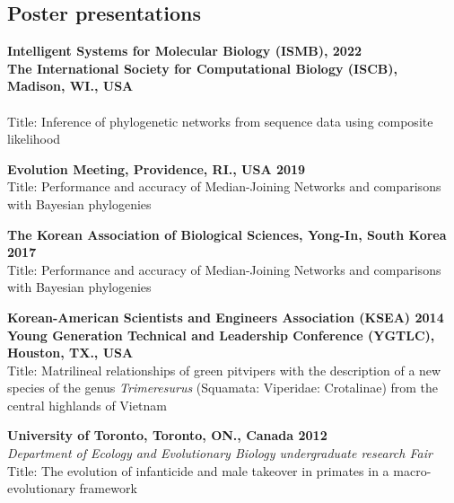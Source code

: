 \documentclass[11pt,letterpaper,sans]{moderncv} %
\begin{document}
\subsection{Poster presentations}
\begin{etaremune}
	\item \textbf{Intelligent Systems for Molecular Biology (ISMB), \hfill 2022}\\ \textbf{The International Society for Computational Biology (ISCB), Madison, WI., USA}\\
		{\small{}\\
		Title: Inference of phylogenetic networks from sequence data using composite likelihood}

	\item \textbf{Evolution Meeting, Providence, RI., USA \hfill 2019}\\
		{\small Title: Performance and accuracy of Median-Joining Networks and comparisons with Bayesian phylogenies}

	\item \textbf{The Korean Association of Biological Sciences, Yong-In, South Korea \hfill 2017}\\
		{\small Title: Performance and accuracy of Median-Joining Networks and comparisons with Bayesian phylogenies}
		  		  
	\item \textbf{Korean-American Scientists and Engineers Association (KSEA) \hfill{2014}\\
	Young Generation Technical and Leadership Conference (YGTLC), Houston, TX., USA}\\
		{\small Title: Matrilineal relationships of green pitvipers with the description of a new species of the genus \textit{Trimeresurus} (Squamata: Viperidae: Crotalinae) from the central highlands of Vietnam}
	
		\item \textbf{University of Toronto, Toronto, ON., Canada \hfill 2012}\\
		{\small \textit{Department of Ecology and Evolutionary Biology undergraduate research Fair}\\
		Title: The evolution of infanticide and male takeover in primates in a macro- evolutionary framework}
\end{etaremune}
\end{document}
